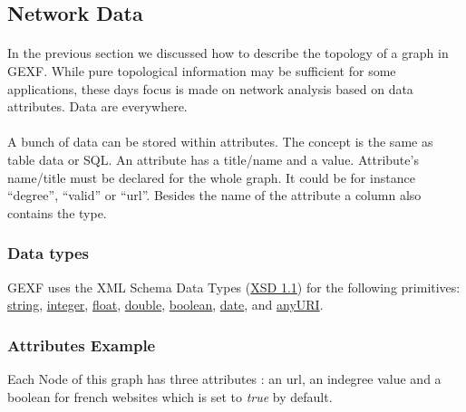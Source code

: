 \documentclass[a4paper,10pt]{article}
\begin{document}
\subsection{Network Data} \label{networkdata}

\paragraph{}
In the previous section we discussed how to describe the topology of a graph in GEXF. While pure topological information may be sufficient for some applications, these days focus is made on network analysis based on data attributes. Data are everywhere.

\paragraph{}
A bunch of data can be stored within attributes. The concept is the same as table data or SQL. An attribute has a title/name and a value. Attribute’s name/title must be declared for the whole graph. It could be for instance “degree”, “valid” or “url”. Besides the name of the attribute a column also contains the type.

\subsubsection{Data types}

GEXF uses the XML Schema Data Types (\href{http://www.w3.org/TR/xmlschema-2/}{XSD 1.1}) for the following primitives: \href{http://www.w3.org/TR/xmlschema-2/#string}{string}, \href{http://www.w3.org/TR/xmlschema-2/#decimal}{integer}, \href{http://www.w3.org/TR/xmlschema-2/#float}{float}, \href{http://www.w3.org/TR/xmlschema-2/#double}{double}, \href{http://www.w3.org/TR/xmlschema-2/#boolean}{boolean}, \href{http://www.w3.org/TR/xmlschema-2/#date}{date}, and \href{http://www.w3.org/TR/xmlschema-2/#anyURI}{anyURI}.

\subsubsection{Attributes Example}

Each Node of this graph has three attributes : an url, an indegree value and a boolean for french websites which is set to \textit{true} by default.
\end{document}
